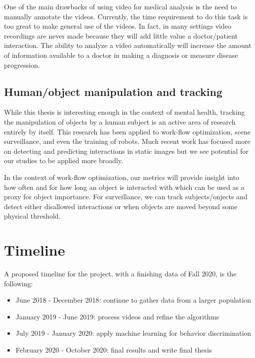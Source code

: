 \documentclass[11pt]{article}
\begin{document}
One of the main drawbacks of using video for medical analysis is the need to manually annotate the videos. Currently, the time requirement to do this task is too great to make general use of the videos. In fact, in many settings video recordings are never made because they will add little value a doctor/patient interaction. The ability to analyze a video automatically will increase the amount of information available to a doctor in making a diagnosis or measure disease progression.
\subsection{Human/object manipulation and tracking}
While this thesis is interesting enough in the context of mental health, tracking the manipulation of objects by a human subject is an active area of research entirely by itself. This research has been applied to work-flow optimization, scene surveillance, and even the training of robots. Much recent work has focused more on detecting and predicting interactions in static images but we see potential for our studies to be applied more broadly.

In the context of work-flow optimization, our metrics will provide insight into how often and for how long an object is interacted with which can be used as a proxy for object importance. For surveillance, we can track subjects/onjects and detect either disallowed interactions or when objects are moved beyond some physical threshold.
\section{Timeline}
A proposed timeline for the project, with a finishing data of Fall 2020, is the following:
\begin{itemize}
  \item June 2018 - December 2018: continue to gather data from a larger population
  \item January 2019 - June 2019: process videos and refine the algorithms
  \item July 2019 - January 2020: apply machine learning for behavior discrimination
  \item February 2020 - October 2020: final results and write final thesis
\end{itemize}

\pagebreak
%

\end{document}
